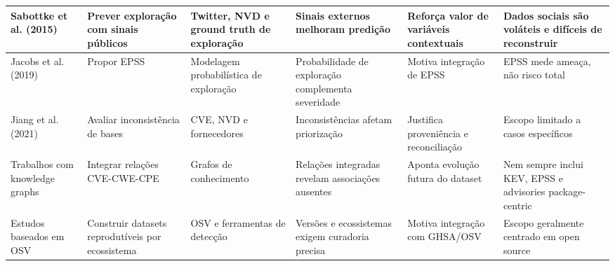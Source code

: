 \begin{table}[htbp]
{\begin{tabular}{|p{2.7cm}|p{2.3cm}|p{2.8cm}|p{3.0cm}|p{3.1cm}|p{3.4cm}|}
            \hline
            Sabottke et al. (2015)         & Prever exploração com sinais públicos            & Twitter, NVD e ground truth de exploração   & Sinais externos melhoram predição                  & Reforça valor de variáveis contextuais           & Dados sociais são voláteis e difíceis de reconstruir                 \\
            \hline
            Jacobs et al. (2019)           & Propor EPSS                                      & Modelagem probabilística de exploração      & Probabilidade de exploração complementa severidade & Motiva integração de EPSS                        & EPSS mede ameaça, não risco total                                    \\
            \hline
            Jiang et al. (2021)            & Avaliar inconsistência de bases                  & CVE, NVD e fornecedores                     & Inconsistências afetam priorização                 & Justifica proveniência e reconciliação           & Escopo limitado a casos específicos                                  \\
            \hline
            Trabalhos com knowledge graphs & Integrar relações CVE-CWE-CPE                    & Grafos de conhecimento                      & Relações integradas revelam associações ausentes   & Aponta evolução futura do dataset                & Nem sempre inclui KEV, EPSS e advisories package-centric             \\
            \hline
            Estudos baseados em OSV        & Construir datasets reprodutíveis por ecossistema & OSV e ferramentas de detecção               & Versões e ecossistemas exigem curadoria precisa    & Motiva integração com GHSA/OSV                   & Escopo geralmente centrado em open source                            \\
            \hline
        \end{tabular}%
    }
\end{table}

